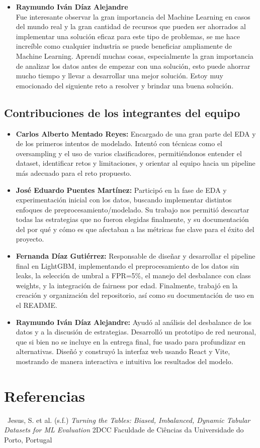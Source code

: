 \documentclass[runningheads]{llncs}
\begin{document}
\begin{itemize}
    \item \textbf{Raymundo Iván Díaz Alejandre} \\
    Fue interesante observar la gran importancia del Machine Learning en casos del mundo real y la gran cantidad de recursos que pueden ser ahorrados al implementar una solución eficaz para este tipo de problemas, se me hace increíble como cualquier industria se puede beneficiar ampliamente de Machine Learning. Aprendí muchas cosas, especialmente la gran importancia de analizar los datos antes de empezar con una solución, esto puede ahorrar mucho tiempo y llevar a desarrollar una mejor solución. Estoy muy emocionado del siguiente reto a resolver y brindar una buena solución.
    \vspace{0.3cm}

  \end{itemize}

  \subsection{Contribuciones de los integrantes del equipo}

\begin{itemize}
    \item \textbf{Carlos Alberto Mentado Reyes:} Encargado de una gran parte del EDA y de los primeros intentos de modelado. Intentó con técnicas como el oversampling y el uso de varios clasificadores, permitiéndonos entender el dataset, identificar retos y limitaciones, y orientar al equipo hacia un pipeline más adecuado para el reto propuesto.
    
    \item \textbf{José Eduardo Puentes Martínez:} Participó en la fase de EDA y experimentación inicial con los datos, buscando implementar distintos enfoques de preprocesamiento/modelado. Su trabajo nos permitió descartar todas las estrategias que no fueron elegidas finalmente, y su documentación del por qué y cómo es que afectaban a las métricas fue clave para el éxito del proyecto.
    
    \item \textbf{Fernanda Díaz Gutiérrez:} Responsable de diseñar y desarrollar el pipeline final en LightGBM, implementando el preprocesamiento de los datos sin leaks, la selección de umbral a FPR=5\%, el manejo del desbalance con class weights, y la integración de fairness por edad. Finalmente, trabajó en la creación y organización del repositorio, así como su documentación de uso en el README.
    
    \item \textbf{Raymundo Iván Díaz Alejandre:} Ayudó al análisis del desbalance de los datos y a la discusión de estrategias. Desarrolló un prototipo de red neuronal, que si bien no se incluye en la entrega final, fue usado para profundizar en alternativas. Diseñó y construyó la interfaz web usando React y Vite, mostrando de manera interactiva e intuitiva los resultados del modelo. 
\end{itemize}

\section{Referencias}
\ Jesus, S. et al. (s.f.) \textit{Turning the Tables: Biased, Imbalanced, Dynamic Tabular Datasets for ML Evaluation} 2DCC Faculdade de Ciências da Universidade do Porto, Portugal \ \ \ \
\end{document}
